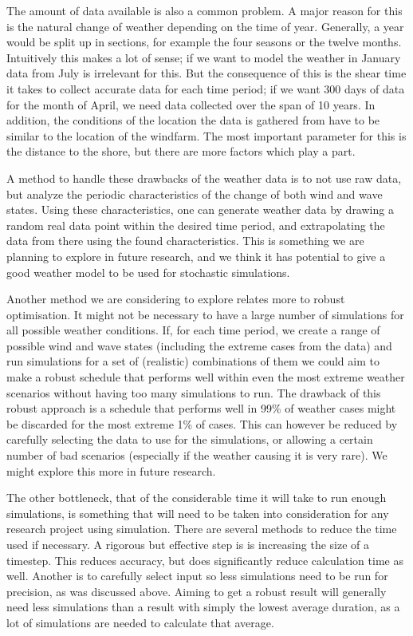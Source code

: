 \documentclass[a4paper,12pt]{article}
\begin{document}
The amount of data available is also a common problem. A major reason for this is the natural change of weather depending on the time of year. Generally, a year would be split up in sections, for example the four seasons or the twelve months. Intuitively this makes a lot of sense; if we want to model the weather in January data from July is irrelevant for this. But the consequence of this is the shear time it takes to collect accurate data for each time period; if we want 300 days of data for the month of April, we need data collected over the span of 10 years. In addition, the conditions of the location the data is gathered from have to be similar to the location of the windfarm. The most important parameter for this is the distance to the shore, but there are more factors which play a part. 

A method to handle these drawbacks of the weather data is to not use raw data, but analyze the periodic characteristics of the change of both wind and wave states. Using these characteristics, one can generate weather data by drawing a random real data point within the desired time period, and extrapolating the data from there using the found characteristics. This is something we are planning to explore in future research, and we think it has potential to give a good weather model to be used for stochastic simulations. 

Another method we are considering to explore relates more to robust optimisation. It might not be necessary to have a large number of simulations for all possible weather conditions. If, for each time period, we create a range of possible wind and wave states (including the extreme cases from the data) and run simulations for a set of (realistic) combinations of them we could aim to make a robust schedule that performs well within even the most extreme weather scenarios without having too many simulations to run. The drawback of this robust approach is a schedule that performs well in 99\% of weather cases might be discarded for the most extreme 1\% of cases. This can however be reduced by carefully selecting the data to use for the simulations, or allowing a certain number of bad scenarios (especially if the weather causing it is very rare). We might explore this more in future research. 


\bigskip

The other bottleneck, that of the considerable time it will take to run enough simulations, is something that will need to be taken into consideration for any research project using simulation. There are several methods to reduce the time used if necessary. A rigorous but effective step is is increasing the size of a timestep. This reduces accuracy, but does significantly reduce calculation time as well. Another is to carefully select input so less simulations need to be run for precision, as was discussed above. Aiming to get a robust result will generally need less simulations than a result with simply the lowest average duration, as a lot of simulations are needed to calculate that average. 
\end{document}
